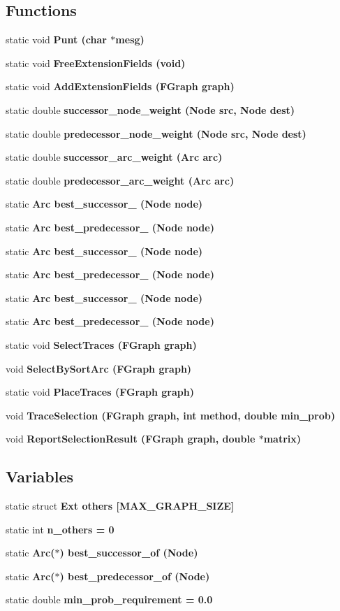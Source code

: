 \subsection*{Functions}
\begin{CompactItemize}
\item 
static void \bf{Punt} (char $\ast$mesg)
\item 
static void \bf{Free\-Extension\-Fields} (void)
\item 
static void \bf{Add\-Extension\-Fields} (\bf{FGraph} \bf{graph})
\item 
static double \bf{successor\_\-node\_\-weight} (\bf{Node} src, \bf{Node} dest)
\item 
static double \bf{predecessor\_\-node\_\-weight} (\bf{Node} src, \bf{Node} dest)
\item 
static double \bf{successor\_\-arc\_\-weight} (\bf{Arc} arc)
\item 
static double \bf{predecessor\_\-arc\_\-weight} (\bf{Arc} arc)
\item 
static \bf{Arc} \bf{best\_\-successor\_} (\bf{Node} \bf{node})
\item 
static \bf{Arc} \bf{best\_\-predecessor\_} (\bf{Node} \bf{node})
\item 
static \bf{Arc} \bf{best\_\-successor\_} (\bf{Node} \bf{node})
\item 
static \bf{Arc} \bf{best\_\-predecessor\_} (\bf{Node} \bf{node})
\item 
static \bf{Arc} \bf{best\_\-successor\_} (\bf{Node} \bf{node})
\item 
static \bf{Arc} \bf{best\_\-predecessor\_} (\bf{Node} \bf{node})
\item 
static void \bf{Select\-Traces} (\bf{FGraph} \bf{graph})
\item 
void \bf{Select\-By\-Sort\-Arc} (\bf{FGraph} \bf{graph})
\item 
static void \bf{Place\-Traces} (\bf{FGraph} \bf{graph})
\item 
void \bf{Trace\-Selection} (\bf{FGraph} \bf{graph}, int method, double min\_\-prob)
\item 
void \bf{Report\-Selection\-Result} (\bf{FGraph} \bf{graph}, double $\ast$matrix)
\end{CompactItemize}
\subsection*{Variables}
\begin{CompactItemize}
\item 
static struct \bf{Ext} \bf{others} [MAX\_\-GRAPH\_\-SIZE]
\item 
static int \bf{n\_\-others} = 0
\item 
static \bf{Arc}($\ast$) \bf{best\_\-successor\_\-of} (\bf{Node})
\item 
static \bf{Arc}($\ast$) \bf{best\_\-predecessor\_\-of} (\bf{Node})
\item 
static double \bf{min\_\-prob\_\-requirement} = 0.0
\end{CompactItemize}



